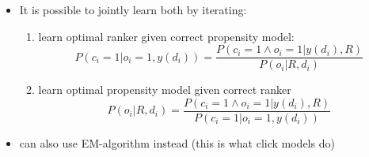 \begin{itemize}
\begin{itemize}
		\item It is possible to jointly learn both by iterating:
		\begin{enumerate}
			\item learn optimal ranker given correct propensity model:
			$$ P(c_i = 1 |o_i =1, y(d_i)) = \dfrac{P(c_i = 1 \land o_i = 1|y(d_i),R)}{P(o_i|R,d_i)}$$
			\item learn optimal propensity model given correct ranker
			$$P(o_i|R,d_i) = \dfrac{P(c_i = 1 \land o_i = 1|y(d_i),R)}{P(c_i = 1|o_i = 1, y(d_i))}$$
		\end{enumerate}
		\item can also use EM-algorithm instead (this is what click models do)
	\end{itemize}
\end{itemize}
